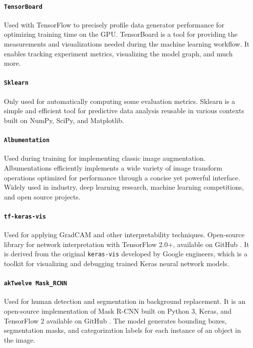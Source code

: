 \paragraph*{\texttt{TensorBoard}}
Used with TensorFlow to precisely profile data generator performance for optimizing training time on the GPU. TensorBoard \cite{tensorboard} is a tool for providing the measurements and visualizations needed during the machine learning workflow. It enables tracking experiment metrics, visualizing the model graph, and much more.

\paragraph*{\texttt{Sklearn}}
Only used for automatically computing some evaluation metrics. Sklearn is a simple and efficient tool for predictive data analysis reusable in various contexts built on NumPy, SciPy, and Matplotlib.

\paragraph*{\texttt{Albumentation}}
Used during training for implementing classic image augmentation. Albumentations \cite{albumentations} efficiently implements a wide variety of image transform operations optimized for performance through a concise yet powerful interface. Widely used in industry, deep learning research, machine learning competitions, and open source projects.

\paragraph*{\texttt{tf-keras-vis}}
Used for applying GradCAM and other interpretability techniques. Open-source library for network interpretation with TensorFlow 2.0+, available on GitHub \cite{tf-keras-vis}. It is derived from the original \texttt{keras-vis} \cite{keras-vis} developed by Google engineers, which is a toolkit for visualizing and debugging trained Keras neural network models.

\paragraph*{\texttt{akTwelve Mask\_RCNN}}
Used for human detection and segmentation in background replacement. It is an open-source implementation of Mask R-CNN built on Python 3, Keras, and TensorFlow 2 available on GitHub \cite{MaskRCNN_akTwelve}. The model generates bounding boxes, segmentation masks, and categorization labels for each instance of an object in the image.
